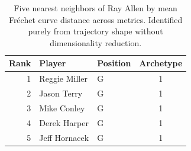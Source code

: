 \begin{table}[htbp]
  \centering\small
  \begin{tabular}{rllc}
    \toprule
    Rank & Player & Position & Archetype \\
    \midrule
    1 & Reggie Miller & G & 1 \\
    2 & Jason Terry & G & 1 \\
    3 & Mike Conley & G & 1 \\
    4 & Derek Harper & G & 1 \\
    5 & Jeff Hornacek & G & 1 \\
    \bottomrule
  \end{tabular}
  \caption{Five nearest neighbors of Ray Allen by mean Fr\'{e}chet curve distance across metrics. Identified purely from trajectory shape without dimensionality reduction.}
  \label{tab:Ray_Allen_frechet_curve_neighbors}
\end{table}

